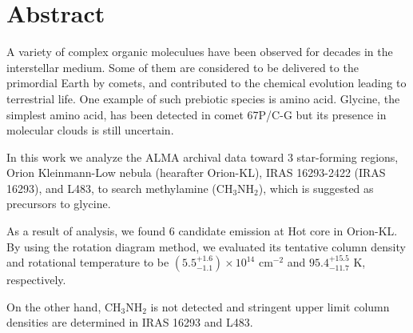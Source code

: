 \chapter*{Abstract}

\singlespacing
\doublespacing

A variety of complex organic moleculues have been observed for decades in the interstellar medium.
Some of them are considered to be delivered to the primordial Earth by comets, 
and contributed to the chemical evolution leading to terrestrial life.
One example of such prebiotic species is amino acid. Glycine, the simplest amino acid, 
has been detected in comet 67P/C-G but its presence in molecular clouds is still uncertain.

In this work we analyze the ALMA archival data toward 3 star-forming regions, 
Orion Kleinmann-Low nebula (hearafter Orion-KL), IRAS 16293-2422 (IRAS 16293), and L483,
to search methylamine (CH$_3$NH$_2$), which is suggested as precursors to glycine. 

As a result of analysis, we found 6 candidate emission at Hot core in Orion-KL.
By using the rotation diagram method, we evaluated its tentative column density 
and rotational temperature to be $(5.5^{+1.6}_{-1.1} ) \times 10^{14}$ cm$^{-2}$ and $95.4^{+15.5}_{-11.7} \,\,\mathrm{K}$, respectively. 

On the other hand, CH$_3$NH$_2$ is not detected and stringent upper limit column densities
are determined in IRAS 16293 and L483.

